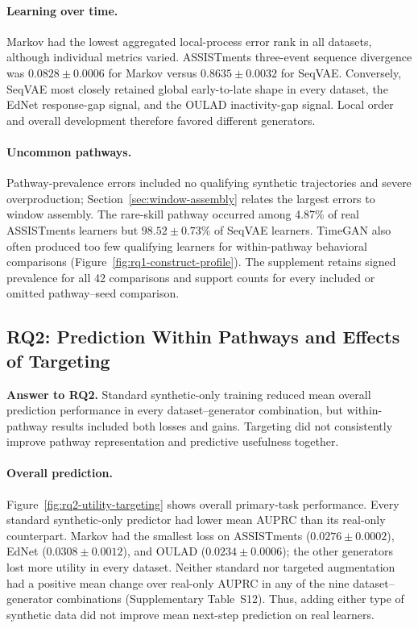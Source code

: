 \documentclass[fleqn,10pt]{JLA_article}
\begin{document}
\paragraph{Learning over time.}
Markov had the lowest aggregated local-process error rank in all datasets, although individual metrics varied. ASSISTments three-event sequence divergence was \(0.0828\pm0.0006\) for Markov versus \(0.8635\pm0.0032\) for SeqVAE. Conversely, SeqVAE most closely retained global early-to-late shape in every dataset, the EdNet response-gap signal, and the OULAD inactivity-gap signal. Local order and overall development therefore favored different generators.

\paragraph{Uncommon pathways.}
Pathway-prevalence errors included no qualifying synthetic trajectories and severe overproduction; Section~\ref{sec:window-assembly} relates the largest errors to window assembly. The rare-skill pathway occurred among 4.87\% of real ASSISTments learners but \(98.52\pm0.73\)\% of SeqVAE learners. TimeGAN also often produced too few qualifying learners for within-pathway behavioral comparisons (Figure~\ref{fig:rq1-construct-profile}). The supplement retains signed prevalence for all 42 comparisons and support counts for every included or omitted pathway--seed comparison.

\subsection{RQ2: Prediction Within Pathways and Effects of Targeting}
\label{sec:rq2-results}

\textbf{Answer to RQ2.} Standard synthetic-only training reduced mean overall prediction performance in every dataset--generator combination, but within-pathway results included both losses and gains. Targeting did not consistently improve pathway representation and predictive usefulness together.

\paragraph{Overall prediction.}
Figure~\ref{fig:rq2-utility-targeting} shows overall primary-task performance. Every standard synthetic-only predictor had lower mean AUPRC than its real-only counterpart. Markov had the smallest loss on ASSISTments (\(0.0276\pm0.0002\)), EdNet (\(0.0308\pm0.0012\)), and OULAD (\(0.0234\pm0.0006\)); the other generators lost more utility in every dataset. Neither standard nor targeted augmentation had a positive mean change over real-only AUPRC in any of the nine dataset--generator combinations (Supplementary Table~S12). Thus, adding either type of synthetic data did not improve mean next-step prediction on real learners.
\end{document}
